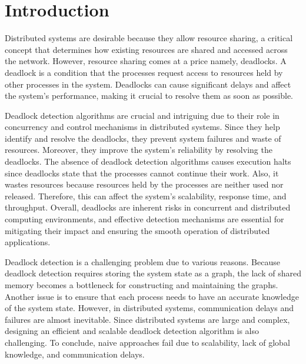 \documentclass[letterpaper,10pt,english]{sphinxmanual}
\begin{document}
\sphinxstepscope


\section{Introduction}
\label{\detokenize{docs/BrachaToueg/introduction:introduction}}\label{\detokenize{docs/BrachaToueg/introduction::doc}}
\sphinxAtStartPar
Distributed systems are desirable because they allow resource sharing, a critical concept that determines how existing resources are shared and accessed across the network. However, resource sharing comes at a price \sphinxhyphen{} namely, deadlocks. A deadlock is a condition that the processes request access to resources held by other processes in the system. Deadlocks can cause significant delays and affect the system’s performance, making it crucial to resolve them as soon as possible.

\sphinxAtStartPar
Deadlock detection algorithms are crucial and intriguing due to their role in concurrency and control mechanisms in distributed systems. Since they help identify and resolve the deadlocks, they prevent system failures and waste of resources. Moreover, they improve the system’s reliability by resolving the deadlocks. The absence of deadlock detection algorithms causes execution halts since deadlocks state that the processes cannot continue their work. Also, it wastes resources because resources held by the processes are neither used nor released. Therefore, this can affect the system’s scalability, response time, and throughput. Overall, deadlocks are inherent risks in concurrent and distributed computing environments, and effective detection mechanisms are essential for mitigating their impact and ensuring the smooth operation of distributed applications.

\sphinxAtStartPar
Deadlock detection is a challenging problem due to various reasons. Because deadlock detection requires storing the system state as a graph, the lack of shared memory becomes a bottleneck for constructing and maintaining the graphs. Another issue is to ensure that each process needs to have an accurate knowledge of the system state. However, in distributed systems, communication delays and failures are almost inevitable. Since distributed systems are large and complex, designing an efficient and scalable deadlock detection algorithm is also challenging. To conclude, naive approaches fail due to scalability, lack of global knowledge, and communication delays.
\end{document}
